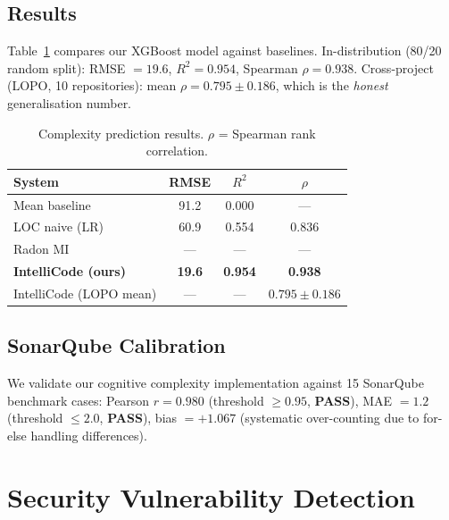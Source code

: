 \documentclass[conference]{IEEEtran}
\begin{document}
\subsection{Results}
Table~\ref{tab:complexity} compares our XGBoost model against baselines.
In-distribution (80/20 random split): RMSE $= 19.6$, $R^2 = 0.954$,
Spearman $\rho = 0.938$.
Cross-project (LOPO, 10 repositories): mean $\rho = 0.795 \pm 0.186$,
which is the \emph{honest} generalisation number.

\begin{table}[t]
\caption{Complexity prediction results.
         $\rho$ = Spearman rank correlation.}
\label{tab:complexity}
\centering
\begin{tabular}{lccc}
\toprule
System & RMSE & $R^2$ & $\rho$ \\
\midrule
Mean baseline    & 91.2  & 0.000 & --- \\
LOC naive (LR)   & 60.9  & 0.554 & 0.836 \\
Radon MI         & ---   & ---   & --- \\
\midrule
\textbf{IntelliCode (ours)} & \textbf{19.6} & \textbf{0.954} & \textbf{0.938} \\
IntelliCode (LOPO mean) & --- & --- & $0.795 \pm 0.186$ \\
\bottomrule
\end{tabular}
\end{table}

\subsection{SonarQube Calibration}
We validate our cognitive complexity implementation against 15 SonarQube
benchmark cases: Pearson $r = 0.980$ (threshold $\geq 0.95$, \textbf{PASS}),
MAE $= 1.2$ (threshold $\leq 2.0$, \textbf{PASS}), bias $= +1.067$
(systematic over-counting due to for-else handling differences).

\section{Security Vulnerability Detection}
\label{sec:security}
\end{document}
